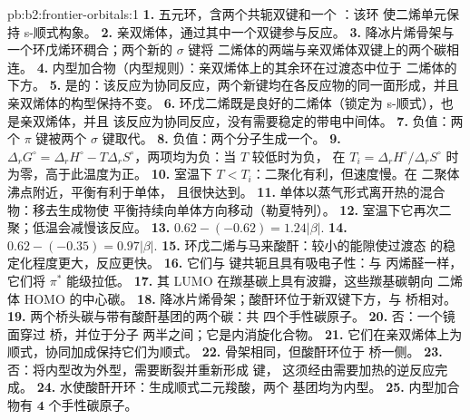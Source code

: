 \begin{solution}{pb:b2:frontier-orbitals:1}
\textbf{1.} 五元环，含两个共轭双键和一个 ：该环
使二烯单元保持 s-顺式构象。
\textbf{2.} 亲双烯体，通过其中一个双键参与反应。
\textbf{3.} 降冰片烯骨架与一个环戊烯环稠合；两个新的 $\sigma$ 键将
二烯体的两端与亲双烯体双键上的两个碳相连。
\textbf{4.} 内型加合物（内型规则）：亲双烯体上的其余环在过渡态中位于
二烯体的下方。
\textbf{5.} 是的：该反应为协同反应，两个新键均在各反应物的同一面形成，并且
亲双烯体的构型保持不变。
\textbf{6.} 环戊二烯既是良好的二烯体（锁定为 s-顺式），也是亲双烯体，并且
该反应为协同反应，没有需要稳定的带电中间体。
\textbf{7.} 负值：两个 $\pi$ 键被两个 $\sigma$ 键取代。
\textbf{8.} 负值：两个分子生成一个。
\textbf{9.} $\Delta_r G^\circ = \Delta_r H^\circ - T\Delta_r S^\circ$，两项均为负：当 $T$ 较低时为负，
在 $T_i = \Delta_r H^\circ/\Delta_r S^\circ$ 时为零，高于此温度为正。
\textbf{10.} 室温下 $T < T_i$：二聚化有利，但速度慢。在
二聚体沸点附近，平衡有利于单体，
且很快达到。
\textbf{11.} 单体以蒸气形式离开热的混合物：移去生成物使
平衡持续向单体方向移动（勒夏特列）。
\textbf{12.} 室温下它再次二聚；低温会减慢该反应。
\textbf{13.} $0.62 - (-0.62) = 1.24|\beta|$.
\textbf{14.} $0.62 - (-0.35) = 0.97|\beta|$.
\textbf{15.} 环戊二烯与马来酸酐：较小的能隙使过渡态
的稳定化程度更大，反应更快。
\textbf{16.} 它们与  键共轭且具有吸电子性：与
丙烯醛一样，它们将 $\pi^*$ 能级拉低。
\textbf{17.} 其 LUMO 在羰基碳上具有波瓣，这些羰基碳朝向
二烯体 HOMO 的中心碳。
\textbf{18.} 降冰片烯骨架；酸酐环位于新双键下方，与
 桥相对。
\textbf{19.} 两个桥头碳与带有酸酐基团的两个碳：共
四个手性碳原子。
\textbf{20.} 否：一个镜面穿过  桥，并位于分子
两半之间；它是内消旋化合物。
\textbf{21.} 它们在亲双烯体上为顺式，协同加成保持它们为顺式。
\textbf{22.} 骨架相同，但酸酐环位于  桥一侧。
\textbf{23.} 否：将内型改为外型，需要断裂并重新形成  键，
这须经由需要加热的逆反应完成。
\textbf{24.} 水使酸酐开环：生成顺式二元羧酸，两个  基团均为内型。
\textbf{25.} 内型加合物有 $\boldsymbol{4}$ 个手性碳原子。
\end{solution}
